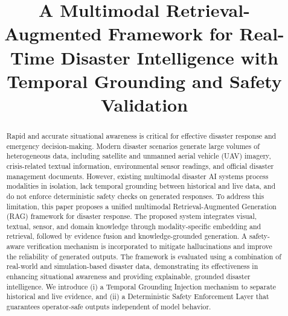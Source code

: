\documentclass[conference]{IEEEtran}
\begin{document}
\title{A Multimodal Retrieval-Augmented Framework for Real-Time Disaster Intelligence with Temporal Grounding and Safety Validation}

\author{

}

\maketitle

\begin{abstract}


Rapid and accurate situational awareness is critical for effective disaster response and emergency decision-making. Modern disaster scenarios generate large volumes of heterogeneous data, including satellite and unmanned aerial vehicle (UAV) imagery, crisis-related textual information, environmental sensor readings, and official disaster management documents. However, existing multimodal disaster AI systems process modalities in isolation, lack temporal grounding between historical and live data, and do not enforce deterministic safety checks on generated responses. To address this limitation, this paper proposes a unified multimodal Retrieval-Augmented Generation (RAG) framework for disaster response.  The proposed system integrates visual, textual, sensor, and domain knowledge through modality-specific embedding and retrieval, followed by evidence fusion and knowledge-grounded generation. A safety-aware verification mechanism is incorporated to mitigate hallucinations and improve the reliability of generated outputs. The framework is evaluated using a combination of real-world and simulation-based disaster data, demonstrating its effectiveness in enhancing situational awareness and providing explainable, grounded disaster intelligence. We introduce (i) a Temporal Grounding Injection mechanism to separate historical and live evidence, and (ii) a Deterministic Safety Enforcement Layer that guarantees operator-safe outputs independent of model behavior.
\end{abstract}
\end{document}
